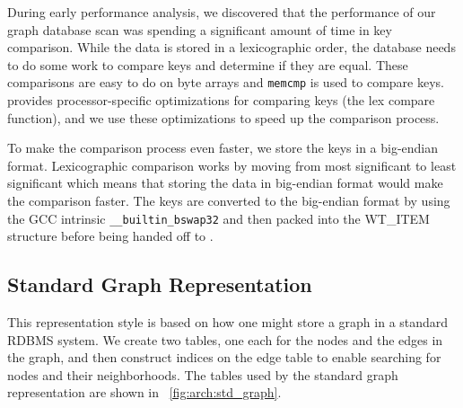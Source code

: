 During early performance analysis, we discovered that the performance of our graph database scan was spending a significant amount of time in key comparison.
While the data is stored in a lexicographic order, the database needs to do some work to compare keys and determine if they are equal.
These comparisons are easy to do on byte arrays and \texttt{memcmp} is used to compare keys.
\wt{} provides processor-specific optimizations for comparing keys (the lex compare function), and we use these optimizations to speed up the comparison process.

To make the comparison process even faster, we store the keys in a big-endian format.
Lexicographic comparison works by moving from most significant to least significant which means that storing the data in big-endian format would make the comparison faster.
The keys are converted to the big-endian format by using the GCC intrinsic \texttt{\_\_builtin\_bswap32} and then packed into the WT\_ITEM structure before being handed off to \wt{}.

\subsection{Standard Graph Representation}
\label{arch:std}
This representation style is based on how one might store a graph in a standard RDBMS system.  
We create two tables, one each for the nodes and the edges in the graph, and then construct indices on the edge table to enable searching for nodes and their neighborhoods. The tables used by the standard graph representation are shown in ~\autoref{fig:arch:std_graph}.

